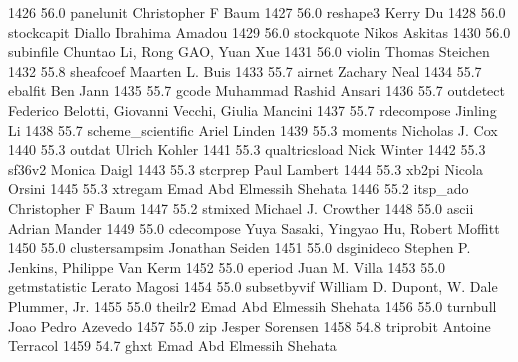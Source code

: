   1426     56.0    panelunit     Christopher F Baum                      
  1427     56.0    reshape3      Kerry Du                                
  1428     56.0    stockcapit    Diallo Ibrahima Amadou                  
  1429     56.0    stockquote    Nikos Askitas                           
  1430     56.0    subinfile     Chuntao Li, Rong GAO, Yuan Xue          
  1431     56.0    violin        Thomas Steichen                         
  1432     55.8    sheafcoef     Maarten L. Buis                         
  1433     55.7    airnet        Zachary Neal                            
  1434     55.7    ebalfit       Ben Jann                                
  1435     55.7    gcode         Muhammad Rashid Ansari                  
  1436     55.7    outdetect     Federico Belotti, Giovanni Vecchi,      
                                   Giulia Mancini                          
  1437     55.7    rdecompose    Jinling Li                              
  1438     55.7    scheme_scientific  Ariel Linden                            
  1439     55.3    moments       Nicholas J. Cox                         
  1440     55.3    outdat        Ulrich Kohler                           
  1441     55.3    qualtricsload  Nick Winter                             
  1442     55.3    sf36v2        Monica Daigl                            
  1443     55.3    stcrprep      Paul Lambert                            
  1444     55.3    xb2pi         Nicola Orsini                           
  1445     55.3    xtregam       Emad Abd Elmessih Shehata               
  1446     55.2    itsp_ado      Christopher F Baum                      
  1447     55.2    stmixed       Michael J. Crowther                     
  1448     55.0    ascii         Adrian Mander                           
  1449     55.0    cdecompose    Yuya Sasaki, Yingyao Hu, Robert Moffitt 
  1450     55.0    clustersampsim  Jonathan Seiden                         
  1451     55.0    dsginideco    Stephen P. Jenkins, Philippe Van Kerm   
  1452     55.0    eperiod       Juan M. Villa                           
  1453     55.0    getmstatistic  Lerato Magosi                           
  1454     55.0    subsetbyvif   William D. Dupont, W. Dale Plummer, Jr. 
  1455     55.0    theilr2       Emad Abd Elmessih Shehata               
  1456     55.0    turnbull      Joao Pedro Azevedo                      
  1457     55.0    zip           Jesper Sorensen                         
  1458     54.8    triprobit     Antoine Terracol                        
  1459     54.7    ghxt          Emad Abd Elmessih Shehata               
